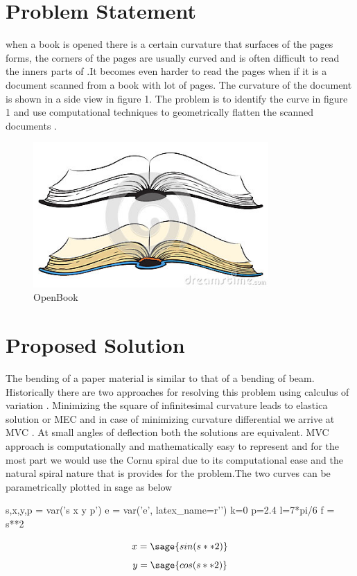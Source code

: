 \documentclass[longbibliography]{revtex4-1}
\begin{document}
\section{Problem Statement}
when a book is opened there is a certain curvature that surfaces of the pages forms, the corners of the pages are usually curved and is often difficult to read the inners parts of .It becomes even harder to read the pages when if it is a document scanned from a book with lot of pages. The curvature of the document is shown in a side view in figure 1. The problem is to identify the curve in figure 1 and use computational techniques to geometrically flatten the scanned documents .
\begin{figure}
  \centering
  \caption{OpenBook}
  \includegraphics[width=0.8\textwidth,natwidth=610,natheight=642]{figure1.jpg} 
\end{figure}

\section{Proposed Solution}
The bending of a paper material is similar to that of a bending of beam. Historically there are two approaches for resolving this problem using calculus of variation . Minimizing the square of infinitesimal curvature leads to elastica solution or MEC and in case of minimizing curvature differential we arrive at MVC . At small angles of deflection both the solutions are equivalent. MVC approach is computationally and mathematically easy to represent and for the most part we would use the Cornu spiral due to its computational ease and the natural spiral nature that is provides for the problem.The two curves can be parametrically plotted in sage as below

\begin{sagesilent}
s,x,y,p = var('s x y p')
e = var('e', latex_name=r'\vartheta')
k=0
p=2.4
l=7*pi/6
f = s**2
\end{sagesilent}
\[
x=\sage{sin(s**2)}
\]
\[
y=\sage{cos(s**2)}
\]
\begin{center}
\end{center}
\end{document}
